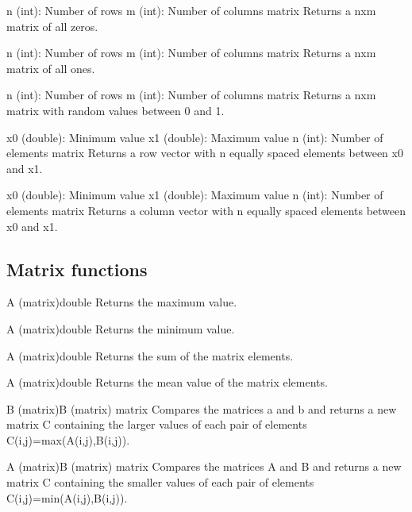 {n (int): Number of rows\newline
m (int): Number of columns}
{matrix}
{Returns a nxm matrix of all zeros.}

{n (int): Number of rows\newline
m (int): Number of columns}
{matrix}
{Returns a nxm matrix of all ones.}

{n (int): Number of rows\newline
m (int): Number of columns}
{matrix}
{Returns a nxm matrix with random values between 0 and 1.}

{x0 (double): Minimum value\newline
x1 (double): Maximum value\newline
n (int): Number of elements}
{matrix}
{Returns a row vector with n equally spaced elements between x0 and x1.}

{x0 (double): Minimum value\newline
x1 (double): Maximum value\newline
n (int): Number of elements}
{matrix}
{Returns a column vector with n equally spaced elements between x0 and x1.}

\subsection{Matrix functions}

{A (matrix)}{double}
{Returns the maximum value.}

{A (matrix)}{double}
{Returns the minimum value.}

{A (matrix)}{double}
{Returns the sum of the matrix elements.}

{A (matrix)}{double}
{Returns the mean value of the matrix elements.}

{B (matrix)\newline B (matrix)}
{matrix}
{Compares the matrices a and b and returns a new matrix C containing the larger values of each pair of 
elements C(i,j)=max(A(i,j),B(i,j)). }

{A (matrix)\newline B (matrix)}
{matrix}
{Compares the matrices A and B and returns a new matrix C containing the smaller values of each pair of 
elements C(i,j)=min(A(i,j),B(i,j)). }

